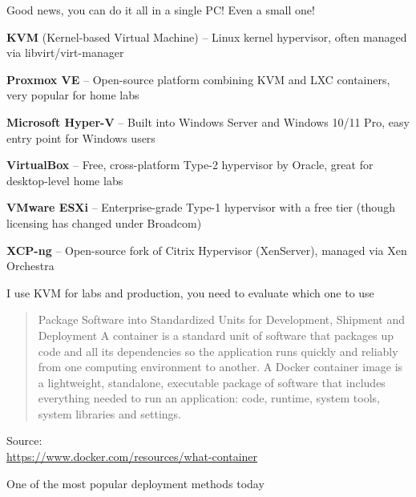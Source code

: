 \documentclass[Screen16to9,17pt]{foils}
\begin{document}
Good news, you can do it all in a single PC! Even a small one!


\begin{list2}
  \item {\bf KVM} (Kernel-based Virtual Machine) -- Linux kernel hypervisor, often managed via libvirt/virt-manager
  \item {\bf Proxmox VE} -- Open-source platform combining KVM and LXC containers, very popular for home labs
  \item {\bf Microsoft Hyper-V} -- Built into Windows Server and Windows 10/11 Pro, easy entry point for Windows users
  \item {\bf VirtualBox} -- Free, cross-platform Type-2 hypervisor by Oracle, great for desktop-level home labs
  \item {\bf VMware ESXi} -- Enterprise-grade Type-1 hypervisor with a free tier (though licensing has changed under Broadcom)
  \item {\bf XCP-ng} -- Open-source fork of Citrix Hypervisor (XenServer), managed via Xen Orchestra
\end{list2}

I use KVM for labs and production, you need to evaluate which one to use



\begin{quote}
  Package Software into Standardized Units for Development, Shipment and Deployment
  A container is a standard unit of software that packages up code and all its dependencies so the application runs quickly and reliably from one computing environment to another. A Docker container image is a lightweight, standalone, executable package of software that includes everything needed to run an application: code, runtime, system tools, system libraries and settings.
\end{quote}
Source: \\{\footnotesize
\url{https://www.docker.com/resources/what-container}}

\begin{list2}
  \item One of the most popular deployment methods today
\end{list2}


\end{document}

